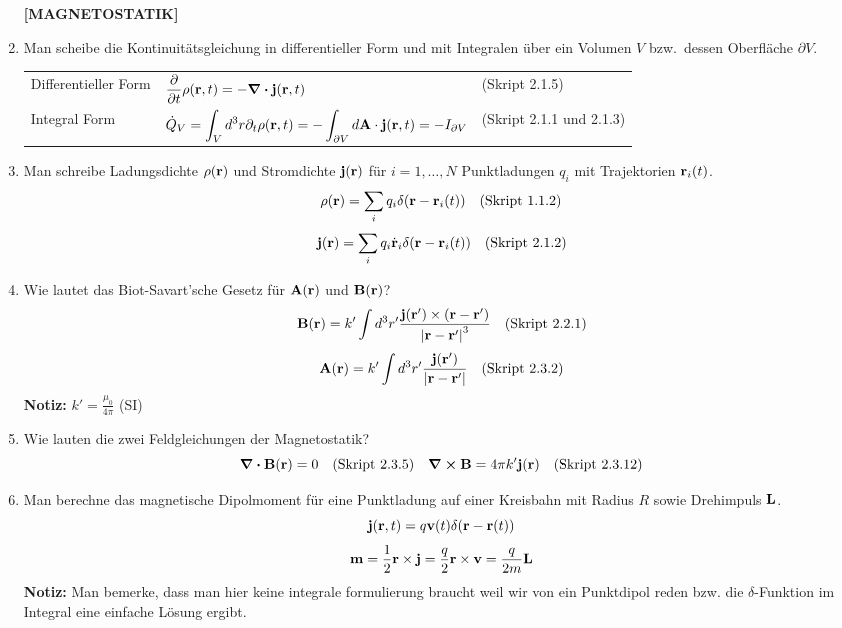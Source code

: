 \documentclass{scrartcl}
\newcommand{\rr}[1]{\frac{#1}{\abs{\vb{r}-\vb{r}'}}}
\newcommand{\ds}{\displaystyle}
\newcommand{\smref}[1]{\quad\text{(Skript #1)}}
\begin{document}
\begin{enumerate}
    \textbf{[MAGNETOSTATIK]}
    \item Man scheibe die Kontinuitätsgleichung in differentieller Form
          und mit Integralen über ein Volumen $V$ bzw.\ dessen Oberfläche 
          $\partial V$.
          \begin{center}
          \begin{tabular}{lll}
            Differentieller Form 
                              & $\ds\pdv{t}\rho(\vb r, t)=
                                 -\div\vb j(\vb r, t)$
                                & (Skript 2.1.5)\\
            Integral Form     & $\ds\dot Q_V
                                =\int_V d^3r\partial_t\rho(\vb r,t)=
                                -\int_{\partial V}d\vb A\cdot
                                \vb j(\vb r, t)=-I_{\partial V}$
                                & (Skript 2.1.1 und 2.1.3)\\
          \end{tabular}
          \end{center}

    \item Man schreibe Ladungsdichte $\rho(\vb r)$ und Stromdichte
          $\vb j(\vb r)$ für $i=1,\ldots,N$ Punktladungen $q_i$ mit 
          Trajektorien $\vb r_i(t)$.
          $$\rho(\vb r)=\sum_i q_i\delta(\vb r-\vb r_i(t))
          \quad \text{(Skript 1.1.2)}$$
          $$\vb j(\vb r)=\sum_i q_i\dot{\vb r}_i\delta(\vb r-\vb r_i(t))
          \quad \text{(Skript 2.1.2)}$$

    \item Wie lautet das Biot-Savart'sche Gesetz für $\vb A(\vb r)$ und
          $\vb B(\vb r)$?
          $$\vb B(\vb r)=k'\int d^3r'\frac{\vb j(\vb r')\times
          (\vb r-\vb r')}{\abs{\vb r-\vb r'}^3}
          \quad \text{(Skript 2.2.1)}$$
          $$\vb A(\vb r)=k'\int d^3r'\rr{\vb j(\vb r')}
          \quad \text{(Skript 2.3.2)}$$
          \textbf{Notiz:} $k'=\frac{\mu_0}{4\pi}$ (SI)

    \item Wie lauten die zwei Feldgleichungen der Magnetostatik?
      $$\div \vb B(\vb r) = 0\smref{2.3.5}
      \quad \curl \vb B= 4\pi k'\vb j(\vb r)\smref{2.3.12}$$

    \item Man berechne das magnetische Dipolmoment für eine Punktladung auf
          einer Kreisbahn mit Radius $R$ sowie Drehimpuls $\vb L$.
          $$\vb j(\vb r,t)=q\vb v(t)\delta(\vb r-\vb r(t))$$
          $$\vb m = \frac{1}{2}\vb r \times \vb j=\frac{q}{2}\vb 
          r\times\vb v=\frac{q}{2m}\vb L$$
          \textbf{Notiz:} Man bemerke, dass man hier keine integrale 
          formulierung braucht weil wir von ein Punktdipol reden bzw.
          die $\delta$-Funktion im Integral eine einfache Lösung ergibt.


\end{enumerate}
\end{document}

